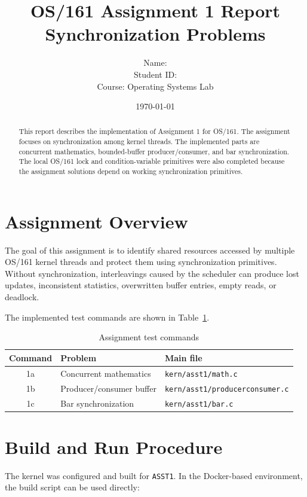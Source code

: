 \documentclass[12pt,a4paper]{article}
\title{\textbf{OS/161 Assignment 1 Report}\\Synchronization Problems}
\author{
    Name: \underline{\hspace{7cm}}\\
    Student ID: \underline{\hspace{6.4cm}}\\
    Course: Operating Systems Lab
}
\date{\today}
\begin{document}
\maketitle

\begin{abstract}
This report describes the implementation of Assignment 1 for OS/161. The
assignment focuses on synchronization among kernel threads. The implemented
parts are concurrent mathematics, bounded-buffer producer/consumer, and bar
synchronization. The
local OS/161 lock and condition-variable primitives were also completed because
the assignment solutions depend on working synchronization primitives.
\end{abstract}

\tableofcontents
\newpage

\section{Assignment Overview}

The goal of this assignment is to identify shared resources accessed by
multiple OS/161 kernel threads and protect them using synchronization
primitives. Without synchronization, interleavings caused by the scheduler can
produce lost updates, inconsistent statistics, overwritten buffer entries,
empty reads, or deadlock.

The implemented test commands are shown in Table~\ref{tab:commands}.

\begin{table}[H]
\centering
\begin{tabular}{|c|l|l|}
\hline
\textbf{Command} & \textbf{Problem} & \textbf{Main file} \\
\hline
1a & Concurrent mathematics & \texttt{kern/asst1/math.c} \\
1b & Producer/consumer buffer & \texttt{kern/asst1/producerconsumer.c} \\
1c & Bar synchronization & \texttt{kern/asst1/bar.c} \\
\hline
\end{tabular}
\caption{Assignment test commands}
\label{tab:commands}
\end{table}

\section{Build and Run Procedure}

The kernel was configured and built for \texttt{ASST1}. In the Docker-based
environment, the build script can be used directly:
\end{document}
